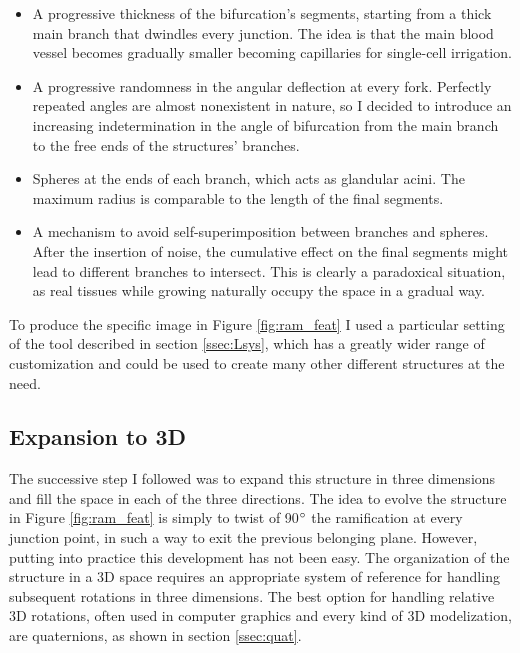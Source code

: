     \begin{itemize}
        \item A progressive thickness of the bifurcation's segments, starting from a thick main branch that dwindles every junction. The idea is that the main blood vessel becomes gradually smaller becoming capillaries for single-cell irrigation.
        \item A progressive randomness in the angular deflection at every fork. Perfectly repeated angles are almost nonexistent in nature, so I decided to introduce an increasing indetermination in the angle of bifurcation from the main branch to the free ends of the structures' branches.
        \item Spheres at the ends of each branch, which acts as glandular acini. The maximum radius is comparable to the length of the final segments.
        \item A mechanism to avoid self-superimposition between branches and spheres. After the insertion of noise, the cumulative effect on the final segments might lead to different branches to intersect. This is clearly a paradoxical situation, as real tissues while growing naturally occupy the space in a gradual way.
    \end{itemize}

    To produce the specific image in Figure \ref{fig:ram_feat} I used a particular setting of the tool described in section \ref{ssec:Lsys}, which has a greatly wider range of customization and could be used to create many other different structures at the need.

\subsection{Expansion to 3D}
    The successive step I followed was to expand this structure in three dimensions and fill the space in each of the three directions. The idea to evolve the structure in Figure \ref{fig:ram_feat} is simply to twist of 90$\degree$ the ramification at every junction point, in such a way to exit the previous belonging plane. However, putting into practice this development has not been easy. The organization of the structure in a 3D space requires an appropriate system of reference for handling subsequent rotations in three dimensions. The best option for handling relative 3D rotations, often used in computer graphics and every kind of 3D modelization, are quaternions, as shown in section \ref{ssec:quat}.

